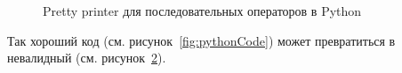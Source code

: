 \begin{figure}[h!]
	\inputminted{haskell}{codes/pythonPrinter.hs}
	\caption{Pretty printer для последовательных операторов в Python}
	\label{fig:pythonPrinter}
\end{figure}

Так хороший код (см. рисунок~\ref{fig:pythonCode}) может превратиться в невалидный (см. рисунок~\ref{fig:pythonCodeBad}).
\begin{figure}[h!]
	\begin{minipage}[b]{0.45\linewidth}
		\inputminted{python}{codes/pythonCode.py}
		\caption{}
		\label{fig:pythonCode}
	\end{minipage}
	\hspace{0.5cm}
	\begin{minipage}[b]{0.45\linewidth}
		\inputminted{python}{codes/pythonCodeBad.py}
		\caption{}
		\label{fig:pythonCodeBad}
	\end{minipage}
\end{figure}